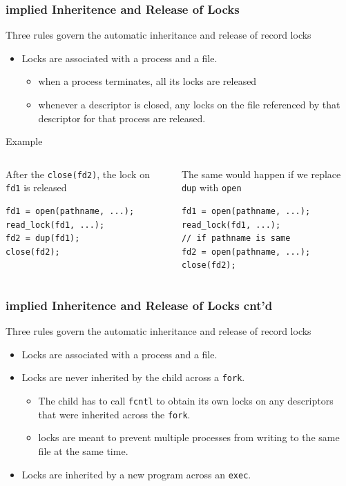 \documentclass[newPxFont,sthlmFooter,nooffset]{beamer}
\begin{document}
\begin{frame}[fragile,t]
  \frametitle{implied Inheritence and Release of Locks}
Three rules govern the automatic inheritance and release of record locks
\begin{itemize}
  \item Locks are associated with a process and a file.
    \begin{itemize}
    \item when a process terminates, all its locks are released
    \item whenever a descriptor is closed, any locks on the file referenced by that descriptor for that process are released.
    \end{itemize}
\end{itemize}

\bigskip
Example

{\footnotesize
\begin{columns}[t]
  \begin{column}{0.5\textwidth}
After the \texttt{close(fd2)}, the lock on \texttt{fd1} is released
\begin{verbatim}
fd1 = open(pathname, ...);
read_lock(fd1, ...);
fd2 = dup(fd1);
close(fd2);
\end{verbatim}
  \end{column}
  \begin{column}{0.5\textwidth}
The same would happen if we replace \texttt{dup} with \texttt{open}
\begin{verbatim}
fd1 = open(pathname, ...);
read_lock(fd1, ...);
// if pathname is same
fd2 = open(pathname, ...);
close(fd2);
\end{verbatim}
  \end{column}
\end{columns}
}
\end{frame}


\begin{frame}[t]
  \frametitle{implied Inheritence and Release of Locks cnt'd}
Three rules govern the automatic inheritance and release of record locks
\begin{itemize}
  \item Locks are associated with a process and a file.
  \item Locks are never inherited by the child across a \texttt{fork}.
    \begin{itemize}
    \item The child has to call \texttt{fcntl} to obtain its own locks on any
      descriptors that were inherited across the \texttt{fork}.
    \item locks are meant to prevent multiple
      processes from writing to the same file at the same time.
    \end{itemize}

  \item Locks are inherited by a new program across an \texttt{exec}.
\end{itemize}

\end{frame}
\end{document}
